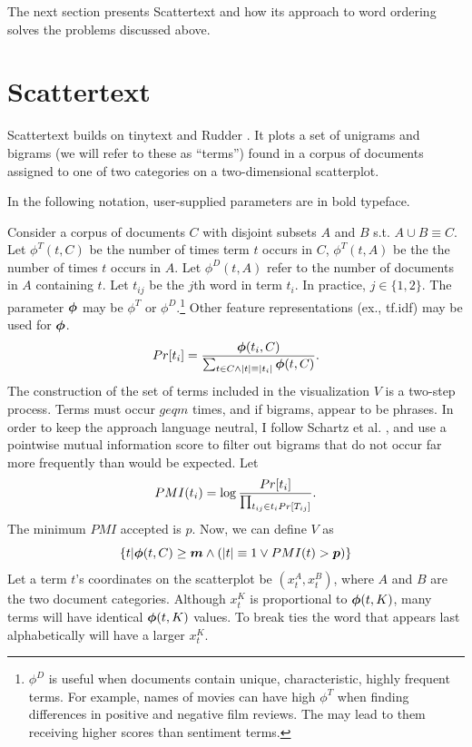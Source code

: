 \documentclass[11pt,a4paper]{article}
\begin{document}
The next section presents Scattertext and how its approach to word ordering solves the problems discussed above. 
\section{Scattertext}
\label{scattertext}
Scattertext builds on tinytext and Rudder .  It plots a set of unigrams and bigrams (we will refer to these as ``terms'') found in a corpus of documents assigned to one of two categories on a two-dimensional scatterplot.  

In the following notation, user-supplied parameters are in bold typeface. 

Consider a corpus of documents $C$ with disjoint subsets $A$ and $B$ s.t. $A \cup B \equiv C$. Let $\phi^T(t,C)$ be the number of times term $t$ occurs in $C$, $\phi^{T}(t,A)$ be the the number of times $t$ occurs in $A$. Let $\phi^{D}(t,A)$ refer to the number of documents in $A$ containing $t$. Let $t_{ij}$ be the $j$th word in term $t_i$. In practice, $j \in \{1,2\}$. The parameter $\mbox{\boldmath$\phi$}$ may be $\phi^T$ or $\phi^D$.\footnote{$\phi^D$ is useful when documents contain unique, characteristic, highly frequent terms.  For example, names of movies can have high $\phi^T$ when finding differences in positive and negative film reviews. The may lead to them receiving higher scores than sentiment terms.}  Other feature representations (ex., tf.idf) may be used for $\mbox{\boldmath$\phi$}$. 
\begin{equation}
\vspace{-.2cm}
Pr[t_i] = \frac{\mbox{\boldmath$\phi$}(t_i,C)}{\sum_{t \in C\wedge|t|\equiv|t_i|} \mbox{\boldmath$\phi$}(t,C)}.
\vspace{-.1cm}
\end{equation}
The construction of the set of terms included in the visualization $V$ is a two-step process. Terms must occur $geq$\mbox{\boldmath$m$} times, and if bigrams, appear to be phrases.  In order to keep the approach language neutral, I follow Schartz et al. , and use a pointwise mutual information score to filter out bigrams that do not occur far more frequently than would be expected.  Let
\begin{equation}
\vspace{-.2cm}
PMI(t_i) = \log \frac{Pr[t_i]}{\prod_{t_{ij}\in t_i{Pr[T_{ij}]}}}.
\end{equation}
The minimum $PMI$ accepted is \mbox{\boldmath$p$}. Now, we can define $V$ as 
\begin{equation}
\{t|\mbox{\boldmath$\phi$}(t,C)\geq\mbox{\boldmath$m$} \wedge (|t| \equiv 1 \vee PMI(t) > \mbox{\boldmath$p$})\}
\end{equation}
Let a term $t$'s coordinates on the scatterplot be $(x^{A}_{t}, x^{B}_t)$, where $A$ and $B$ are the two document categories. Although $x^{K}_t$ is proportional to $\mbox{\boldmath$\phi$}(t,K)$, many terms will have identical $\mbox{\boldmath$\phi$}(t,K)$ values.  To break ties the word that appears last alphabetically will have a larger $x^{K}_t$.
\end{document}
